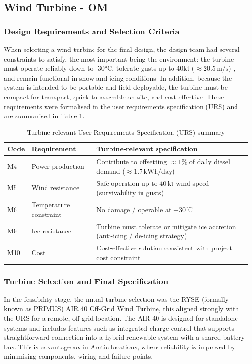 \documentclass[11pt,a4paper]{article}
\begin{document}
\subsection{Wind Turbine - OM}

\subsubsection{Design Requirements and Selection Criteria}
When selecting a wind turbine for the final design, the design team had several constraints to satisfy, the most important being the environment: the turbine must operate reliably down to -30°C, tolerate gusts up to 40kt ($\approx 20.5\,\text{m/s}$) , and remain functional in snow and icing conditions. In addition, because the system is intended to be portable and field-deployable, the turbine must be compact for transport, quick to assemble on site, and cost effective. These requirements were formalised in the user requirements specification (URS) and are summarised in Table \ref{tab:urs_turbine}.

\begin{table}[h]
\centering
\caption{Turbine-relevant User Requirements Specification (URS) summary}
\label{tab:urs_turbine}
\small
\renewcommand{\arraystretch}{1.2}

\begin{tabularx}{\linewidth}{>{\raggedright\arraybackslash}p{1.2cm} >{\raggedright\arraybackslash}p{3.2cm} X}
\hline
\textbf{Code} & \textbf{Requirement} & \textbf{Turbine-relevant specification} \\
\hline
M4 & Power production & Contribute to offsetting $\approx 1\%$ of daily diesel demand ($\approx 1.7\,\mathrm{kWh/day}$) \\
M5 & Wind resistance & Safe operation up to $40\,\mathrm{kt}$ wind speed (survivability in gusts) \\
M6 & Temperature constraint & No damage / operable at $-30^\circ\mathrm{C}$ \\
M9 & Ice resistance & Turbine must tolerate or mitigate ice accretion (anti-icing / de-icing strategy) \\
M10 & Cost & Cost-effective solution consistent with project cost constraint \\
\hline
\end{tabularx}
\end{table}

\subsubsection{Turbine Selection and Final Specification}
In the feasibility stage, the initial turbine selection was the RYSE (formally known as PRIMUS) AIR 40 Off-Grid Wind Turbine, this aligned strongly with the URS for a remote, off-grid location. The AIR 40 is designed for standalone systems and includes features such as integrated charge control that supports straightforward connection into a hybrid renewable system with a shared battery bus. This is advantageous in Arctic locations, where reliability is improved by minimising components, wiring and failure points.
\end{document}
